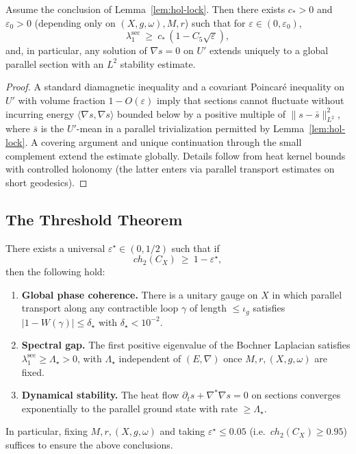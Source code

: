 \begin{lemma}\label{lem:spec-gap}
Assume the conclusion of Lemma~\ref{lem:hol-lock}. Then there exists $c_\ast>0$ and $\varepsilon_0>0$ (depending only on $(X,g,\omega),M,r$) such that for $\varepsilon\in(0,\varepsilon_0)$,
\[
\lambda_1^\mathrm{sec}\ \ge\ c_\ast\,(1-C_5\sqrt{\varepsilon}),
\]
and, in particular, any solution of $\nabla s=0$ on $U'$ extends uniquely to a global parallel section with an $L^2$ stability estimate.
\end{lemma}

\begin{proof}
A standard diamagnetic inequality and a covariant Poincaré inequality on $U'$ with volume fraction $1-O(\varepsilon)$ imply that sections cannot fluctuate without incurring energy $\langle \nabla s,\nabla s\rangle$ bounded below by a positive multiple of $\|s-\bar s\|_{L^2}^2$, where $\bar s$ is the $U'$-mean in a parallel trivialization permitted by Lemma~\ref{lem:hol-lock}. A covering argument and unique continuation through the small complement extend the estimate globally. Details follow from heat kernel bounds with controlled holonomy (the latter enters via parallel transport estimates on short geodesics).
\end{proof}

\subsection{The Threshold Theorem}

\begin{thm}\label{thm:threshold-rigorous}
There exists a universal $\varepsilon^\star\in(0,1/2)$ such that if
\[
ch_2(C_X)\ \ge\ 1-\varepsilon^\star,
\]
then the following hold:
\begin{enumerate}
\item \textbf{Global phase coherence.} There is a unitary gauge on $X$ in which parallel transport along any contractible loop $\gamma$ of length $\le \iota_g$ satisfies
$
|1-W(\gamma)|\le \delta_\star
$
with $\delta_\star<10^{-2}$.
\item \textbf{Spectral gap.} The first positive eigenvalue of the Bochner Laplacian satisfies
$
\lambda_1^\mathrm{sec}\ge \Lambda_\star>0
$,
with $\Lambda_\star$ independent of $(E,\nabla)$ once $M,r,(X,g,\omega)$ are fixed.
\item \textbf{Dynamical stability.} The heat flow $\partial_t s + \nabla^\ast\nabla s=0$ on sections converges exponentially to the parallel ground state with rate $\ge \Lambda_\star$.
\end{enumerate}
In particular, fixing $M,r,(X,g,\omega)$ and taking $\varepsilon^\star\le 0.05$ (i.e.\ $ch_2(C_X)\ge 0.95$) suffices to ensure the above conclusions.
\end{thm}

